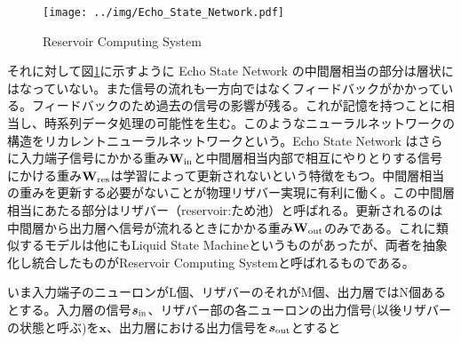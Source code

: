 \documentclass[uplatex,a4paper,10pt]{jsarticle}
\begin{document}
\begin{figure}[hbtp]
	\centering
	\texttt{[image: ../img/Echo\_State\_Network.pdf]}
	\caption{Reservoir Computing System}
	\label{fig:echo_state}
\end{figure}
それに対して図\ref{fig:echo_state}に示すように Echo State Network の中間層相当の部分は層状にはなっていない。また信号の流れも一方向ではなくフィードバックがかかっている。フィードバックのため過去の信号の影響が残る。これが記憶を持つことに相当し、時系列データ処理の可能性を生む。このようなニューラルネットワークの構造をリカレントニューラルネットワークという。Echo State Network はさらに入力端子信号にかかる重み$\mathbf{W_{\rm{in}}}$と中間層相当内部で相互にやりとりする信号にかける重み$\mathbf{W_{\rm{res}}}$は学習によって更新されないという特徴をもつ。中間層相当の重みを更新する必要がないことが物理リザバー実現に有利に働く。この中間層相当にあたる部分はリザバー（reservoir:ため池）と呼ばれる。更新されるのは中間層から出力層へ信号が流れるときにかかる重み$\mathbf{W}_{\rm{out}}$のみである。これに類似するモデルは他にもLiquid State Machineというものがあったが、両者を抽象化し統合したものがReservoir Computing Systemと呼ばれるものである。

いま入力端子のニューロンがL個、リザバーのそれがM個、出力層ではN個あるとする。入力層の信号$\bm{s}_{\rm{in}}$、リザバー部の各ニューロンの出力信号(以後リザバーの状態と呼ぶ)を$\bm{x}$、出力層における出力信号を$\bm{s}_{\rm{out}}$とすると
\end{document}
